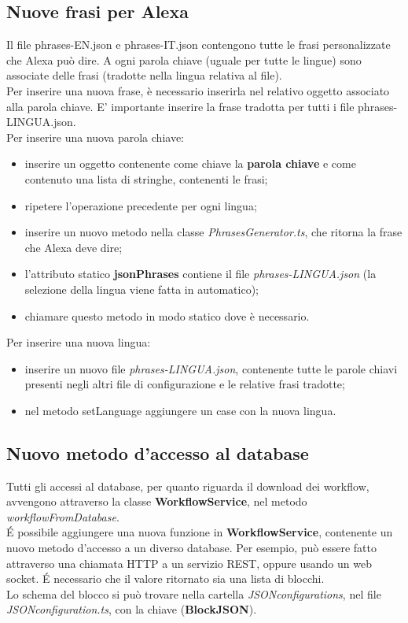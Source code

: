 \subsection{Nuove frasi per Alexa}\label{newFrasi}
Il file phrases-EN.json e phrases-IT.json contengono tutte le frasi personalizzate che Alexa può dire. A ogni parola chiave (uguale per tutte le lingue) sono associate delle frasi (tradotte nella lingua relativa al file).\\
Per inserire una nuova frase, è necessario inserirla nel relativo oggetto associato alla parola chiave. E' importante inserire la frase tradotta per tutti i file phrases-LINGUA.json.\\
Per inserire una nuova parola chiave:
\begin{itemize}
	\item inserire un oggetto contenente come chiave la \textbf{parola chiave} e come contenuto una lista di stringhe, contenenti le frasi;
	\item ripetere l'operazione precedente per ogni lingua;
	\item inserire un nuovo metodo nella classe \textit{PhrasesGenerator.ts}, che ritorna la frase che Alexa deve dire;
	\item l'attributo statico \textbf{jsonPhrases} contiene il file \textit{phrases-LINGUA.json} (la selezione della lingua viene fatta in automatico);
	\item chiamare questo metodo in modo statico dove è necessario.
\end{itemize}
Per inserire una nuova lingua:
\begin{itemize}
	\item inserire un nuovo file \textit{phrases-LINGUA.json}, contenente tutte le parole chiavi presenti negli altri file di configurazione e le relative frasi tradotte;
	\item nel metodo setLanguage aggiungere un case con la nuova lingua.
\end{itemize} 
\subsection{Nuovo metodo d'accesso al database} \label{newAccesso}
Tutti gli accessi al database, per quanto riguarda il download dei workflow, avvengono attraverso la classe \textbf{WorkflowService}, nel metodo \textit{workflowFromDatabase}.\\
\'{E} possibile aggiungere una nuova funzione in \textbf{WorkflowService}, contenente un nuovo metodo d'accesso a un diverso database. Per esempio, può essere fatto attraverso una chiamata HTTP a un servizio REST, oppure usando un web socket. \'{E} necessario che il valore ritornato sia una lista di blocchi.\\
Lo schema del blocco si può trovare nella cartella \textit{JSONconfigurations}, nel file \textit{JSONconfiguration.ts}, con la chiave (\textbf{BlockJSON}).

